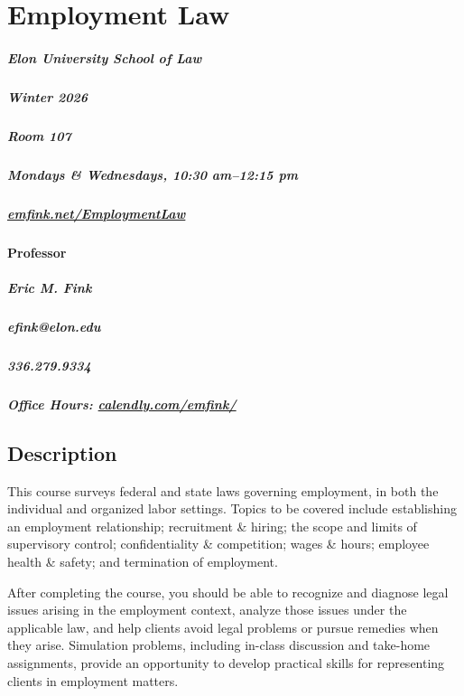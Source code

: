 \documentclass[11pt,letterpaper,twoside]{article}
\begin{document}
\thispagestyle{empty}

\color{OffBlack}


\section{Employment Law}

\begin{footnotesize}
\subparagraph{Elon University School of Law}
\subparagraph{Winter 2026}
\subparagraph{Room 107}
\subparagraph{Mondays \& Wednesdays, 10:30 am--12:15 pm}
\subparagraph{\url{emfink.net/EmploymentLaw}}
\vspace{1em}

\paragraph{Professor}
\subparagraph{Eric M. Fink} 
\subparagraph{efink@elon.edu}
\subparagraph{336.279.9334} 
\subparagraph{Office Hours: {\url{calendly.com/emfink/}}}

\vspace{1em}

\end{footnotesize}

\vspace{1em}


\subsection*{Description}\label{description}

This course surveys federal and state laws governing employment, in both
the individual and organized labor settings. Topics to be covered
include establishing an employment relationship; recruitment \& hiring;
the scope and limits of supervisory control; confidentiality \&
competition; wages \& hours; employee health \& safety; and termination
of employment.

After completing the course, you should be able to recognize and
diagnose legal issues arising in the employment context, analyze those
issues under the applicable law, and help clients avoid legal problems
or pursue remedies when they arise. Simulation problems, including
in-class discussion and take-home assignments, provide an opportunity to
develop practical skills for representing clients in employment matters.
\end{document}
